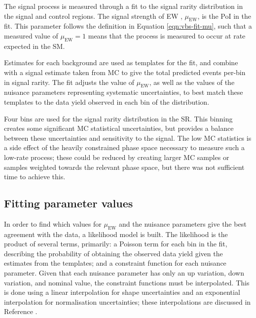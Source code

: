 
\newcommand\muEW{\ensuremath{\mu_{\text{EW}}}\xspace}
The signal process is measured through a fit to the signal rarity distribution
in the signal and control regions. The signal strength of \ac{EW} \VZy,
\muEW, is the \ac{PoI} in the fit. This parameter follows the
definition in Equation \ref{eqn:vbs-fit-mu}, such that a measured value of
$\muEW = 1$ means that the process is measured to occur at rate expected in the
\ac{SM}.

Estimates for each background are used as templates for the fit, and combine
with a signal estimate taken from \ac{MC} to give the total predicted events
per-bin in signal rarity. The fit adjusts the value of \muEW, as well as the
values of the nuisance parameters representing systematic uncertainties, to best
match these templates to the data yield observed in each bin of the
distribution.

Four bins are used for the signal rarity distribution in the \ac{SR}. This
binning creates some significant \ac{MC} statistical uncertainties, but provides
a balance between these uncertainties and sensitivity to the signal. The low
\ac{MC} statistics is a side effect of the heavily constrained phase space
necessary to measure such a low-rate process; these could be reduced by creating
larger \ac{MC} samples or samples weighted towards the relevant phase space, but
there was not sufficient time to achieve this.

\subsection{Fitting parameter values}
In order to find which values for \muEW and the nuisance parameters give the
best agreement with the data, a likelihood model is built. The likelihood is the
product of several terms, primarily: a Poisson term for each bin in the fit,
describing the probability of obtaining the observed data yield given the
estimates from the templates; and a constraint function for each nuisance
parameter. Given that each nuisance parameter has only an up variation, down
variation, and nominal value, the constraint functions must be interpolated.
This is done using a linear interpolation for shape uncertainties and an
exponential interpolation for normalisation uncertainties; these interpolations
are discussed in Reference \cite{Cranmer2012}.

